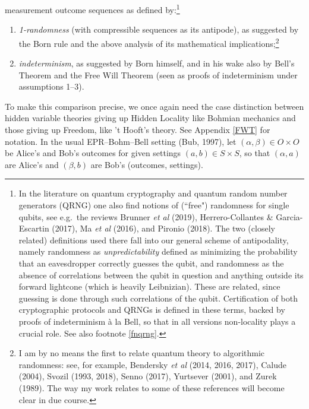 \documentclass[11pt,a4paper]{article}
\numberwithin{equation}{section}
\newcommand{\x}{\times}
\newcommand{\al}{\alpha} \newcommand{\bt}{L\beta}
\begin{document}
 measurement outcome sequences as defined by:\footnote{\label{mrd} In the literature on quantum cryptography and quantum random number generators (QRNG) one also find notions of (``free") randomness for single qubits, see e.g.\ the reviews Brunner  \emph{et al} (2019),   Herrero-Collantes \& Garcia-Escartin (2017), Ma \emph{et al} (2016), and Pironio (2018).
The two (closely related) definitions used there fall  into our general scheme of antipodality, namely randomness as \emph{unpredictability} defined as
minimizing the probability that an eavesdropper correctly guesses the qubit, and randomness as the absence of correlations between the qubit in question and anything outside its forward lightcone (which is heavily Leibnizian). These are related, since guessing is done through such correlations of the qubit.
 Certification of both cryptographic protocols and QRNGs is defined  in these terms, backed by proofs of indeterminism \`{a} la Bell, so that in all versions non-locality plays a crucial role. See also footnote \ref{fnqrng}.}
\begin{enumerate}
\item  \emph{1-randomness}  (with compressible sequences as its antipode), as suggested by the Born rule and the above analysis of its mathematical implications;\footnote{I am  by no means the first to relate quantum theory to algorithmic randomness: see, for example,  Bendersky \emph{et al} (2014, 2016, 2017),  Calude (2004), Svozil (1993, 2018),  Senno (2017), Yurtsever (2001), and Zurek (1989). The way my work relates to some of these references will become clear  in due course.}
\item \emph{indeterminism}, as suggested by Born himself, and  in his wake also by  Bell's Theorem and the Free Will Theorem  (seen as proofs  of indeterminism under  assumptions 1--3).
\end{enumerate}
To make this comparison precise, we once again need the case distinction between hidden variable theories giving up Hidden Locality like Bohmian mechanics and those giving up Freedom, like 't Hooft's theory.  See Appendix \ref{FWT} for notation.  In the usual  EPR--Bohm--Bell setting (Bub, 1997), let $(\al,\beta)\in O\x O$ be Alice's and Bob's outcomes for given settings $(a,b)\in S\x S$, so that $(\al,a)$ are Alice's and $(\beta,b)$ are Bob's (outcomes, settings).
\end{document}
